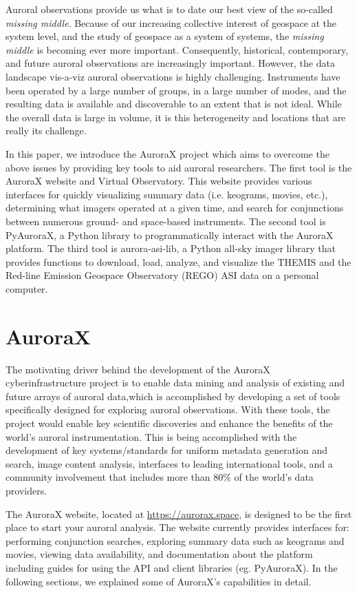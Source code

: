 \documentclass[utf8]{FrontiersinHarvard} %
\begin{document}
Auroral observations provide us what is to date our best view of the so-called \textit{missing middle}. Because of our increasing collective interest of geospace at the system level, and the study of geospace as a system of systems, the \textit{missing middle} is becoming ever more important. Consequently, historical, contemporary, and future auroral observations are increasingly important. However, the data landscape vis-a-viz auroral observations is highly challenging. Instruments have been operated by a large number of groups, in a large number of modes, and the resulting data is available and discoverable to an extent that is not ideal. While the overall data is large in volume, it is this heterogeneity and locations that are really its challenge.

In this paper, we introduce the AuroraX project which aims to overcome the above issues by providing key tools to aid auroral researchers. The first tool is the AuroraX website and Virtual Observatory. This website provides various interfaces for quickly visualizing summary data (i.e. keograms, movies, etc.), determining what imagers operated at a given time, and search for conjunctions between numerous ground- and space-based instruments. The second tool is PyAuroraX, a Python library to programmatically interact with the AuroraX platform. The third tool is aurora-asi-lib, a Python all-sky imager library that provides functions to download, load, analyze, and visualize the THEMIS and the Red-line Emission Geospace Observatory (REGO) ASI data on a personal computer. 

\section{AuroraX}\label{aurorax}
The motivating driver behind the development of the AuroraX cyberinfrastructure project is to enable data mining and analysis of existing and future arrays of auroral data,which is accomplished by developing a set of tools specifically designed for exploring auroral observations. With these tools, the project would enable key scientific discoveries and enhance the benefits of the world's auroral instrumentation. This is being accomplished with the development of key systems/standards for uniform metadata generation and search, image content analysis, interfaces to leading international tools, and a community involvement that includes more than 80\% of the world's data providers. 

The AuroraX website, located at \url{https://aurorax.space}, is designed to be the first place to start your auroral analysis. The website currently provides interfaces for: performing conjunction searches, exploring summary data such as keograms and movies, viewing data availability, and documentation about the platform including guides for using the API and client libraries (eg. PyAuroraX). In the following sections, we explained some of AuroraX's capabilities in detail.
\end{document}
